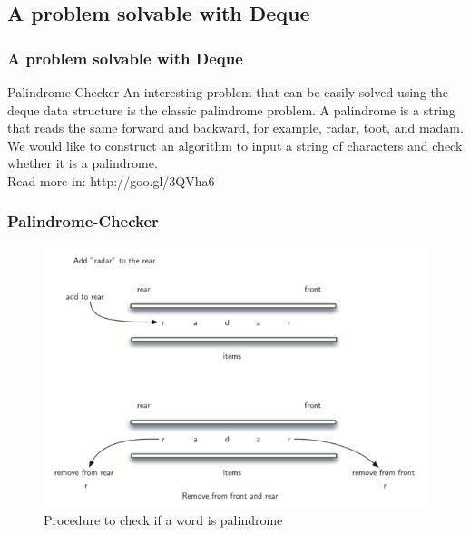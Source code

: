 \documentclass{beamer}
\begin{document}
\subsection{A problem solvable with Deque}
\begin{frame}
\frametitle{A problem solvable with Deque}

\begin{block}{Palindrome-Checker}
An interesting problem that can be easily solved using the deque data structure is the classic palindrome problem. A palindrome is a string that reads the same forward and backward, for example, radar, toot, and madam. We would like to construct an algorithm to input a string of characters and check whether it is a palindrome.
\newline\\
Read more in: http://goo.gl/3QVha6
\end{block}
\end{frame}
\begin{frame}
\frametitle{Palindrome-Checker}
\begin{figure}
	\includegraphics[width=0.85\linewidth]{palindrome.png}
	\caption{Procedure to check if a word is palindrome}
\end{figure}
\end{frame}
\end{document}

